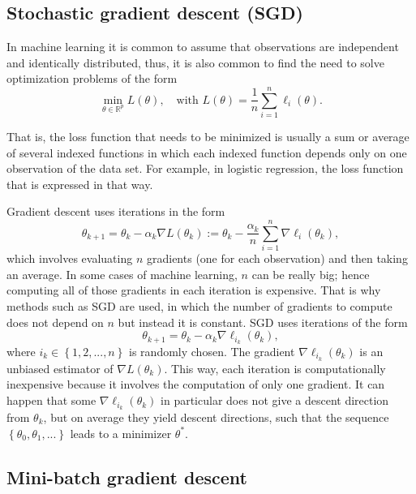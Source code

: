 \subsection{Stochastic gradient descent (SGD)}

In machine learning it is common to assume that observations are independent and identically distributed, thus, it is also common to find the need to solve optimization problems of the form
\begin{equation}
  \min_{\theta \in \mathbb{R}^p} L(\theta), \quad \text{with} \, \,
  L(\theta) = \frac{1}{n} \sum_{i = 1}^n { \ell_i(\theta) }.
\end{equation}

That is, the loss function that needs to be minimized is usually a sum or average of several indexed functions in which each indexed function depends only on one observation of the data set. For example, in logistic regression, the loss function that is expressed in that way.

Gradient descent uses iterations in the form
\begin{equation}
  \theta_{k+1} = \theta_k - \alpha_k \nabla L(\theta_k) :=\theta_k - \frac{\alpha_k}{n} \sum_{i = 1}^n \nabla \ell_i(\theta_k),
\end{equation}
which involves evaluating $n$ gradients (one for each observation) and then taking an average. In some cases of machine learning, $n$ can be really big; hence computing all of those gradients in each iteration is expensive. That is why methods such as SGD are used, in which the number of gradients to compute does not depend on $n$ but instead it is constant. SGD uses iterations of the form
\begin{equation}
  \theta_{k+1} = \theta_k - \alpha_k \nabla \ell_{i_k}(\theta_k),
\end{equation}
where $i_k \in \left\{1, 2, ..., n \right\}$ is randomly chosen. The gradient $\nabla \ell_{i_k}(\theta_k)$ is an unbiased estimator of $\nabla L(\theta_k)$. This way, each iteration is computationally inexpensive because it involves the computation of only one gradient. It can happen that some $\nabla \ell_{i_k}(\theta_k)$ in particular does not give a descent direction from $\theta_k$, but on average they yield descent directions, such that the sequence $\left\{ \theta_0, \theta_1, ... \right\}$ leads to a minimizer $\theta^*$.

\subsection{Mini-batch gradient descent}

